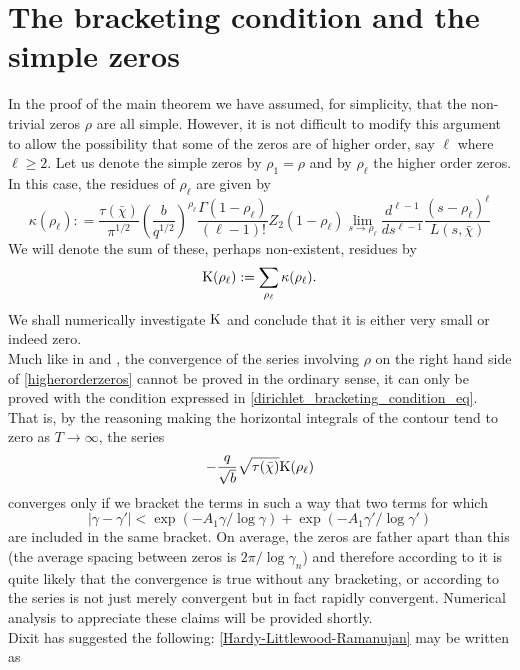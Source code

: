 \documentclass[11pt]{article}
\numberwithin{equation}{section}		 			%
\numberwithin{figure}{section}			 			%
\begin{document}
\section{The bracketing condition and the simple zeros}
\noindent In the proof of the main theorem we have assumed, for simplicity, that the non-trivial zeros $\rho$ are all simple. However, it is not difficult to modify this argument to allow the possibility that some of the zeros are of higher order, say $\ell$ where $\ell \ge 2$. Let us denote the simple zeros by $\rho_1 = \rho$ and by $\rho_\ell$ the higher order zeros. In this case, the residues of $\rho_\ell$ are given by
\[
\kappa (\rho _\ell  ): = \frac{{\tau (\bar \chi )}}
{{\pi ^{1/2} }}\left( {\frac{b}
{{q^{1/2} }}} \right)^{\rho _\ell  } \frac{{\Gamma (1 - \rho _\ell  )}}
{{(\ell  - 1)!}}Z_2 (1 - \rho _\ell  )\mathop {\lim }\limits_{s \to \rho _\ell  } \frac{{d^{\ell  - 1} }}
{{ds^{\ell  - 1} }}\frac{{(s - \rho _\ell  )^\ell  }}
{{L(s,\bar \chi )}}
\]
We will denote the sum of these, perhaps non-existent, residues by
\begin{align} \label{higherorderzeros}
{\rm K}(\rho _\ell  ): = \sum\limits_{\rho _\ell  } {\kappa (\rho _\ell  )} .
\end{align}
We shall numerically investigate $\rm K$ and conclude that it is either very small or indeed zero.\\
Much like in \cite{dixit_1} and \cite{titchmarsh}, the convergence of the series involving $\rho$ on the right hand side of \eqref{higherorderzeros} cannot be proved in the ordinary sense, it can only be proved with the condition expressed in \eqref{dirichlet_bracketing_condition_eq}. That is, by the reasoning making the horizontal integrals of the contour tend to zero as $T \to \infty$, the series
\[
 - \frac{q}
{{\sqrt b }}\sqrt {\tau (\bar \chi )} {\rm K}(\rho _\ell  )
\]
converges only if we bracket the terms in such a way that two terms for which
\[
\left| {\gamma  - \gamma '} \right| < \exp ( - A_1 \gamma /\log \gamma ) + \exp ( - A_1 \gamma '/\log \gamma ')
\]
are included in the same bracket. On average, the zeros are father apart than this (the average spacing between zeros is $2\pi / \log \gamma_n$) and therefore according to \cite{titchmarsh} it is quite likely that the convergence is true without any bracketing, or according to \cite{hardy_littlewood} the series is not just merely convergent but in fact rapidly convergent. Numerical analysis to appreciate these claims will be provided shortly.\\
Dixit \cite{dixit_1} has suggested the following: \eqref{Hardy-Littlewood-Ramanujan} may be written as
\end{document}
